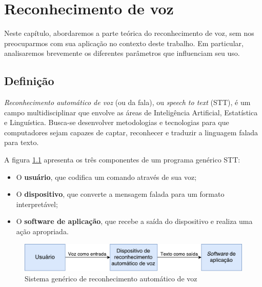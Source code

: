 \chapter{Reconhecimento de voz}
\label{cap:speech-recognition}

Neste capítulo, abordaremos a parte teórica do reconhecimento de voz, sem nos preocuparmos com sua aplicação no contexto deste trabalho. Em particular, analisaremos brevemente os diferentes parâmetros que influenciam seu uso.


\section{Definição}


\textit{Reconhecimento automático de voz} (ou da fala), ou \textit{speech to text} (STT), é um campo multidisciplinar que envolve as áreas de Inteligência Artificial, Estatística e Linguística. Busca-se desenvolver metodologias e tecnologias para que computadores sejam capazes de captar, reconhecer e traduzir a linguagem falada para texto.

A figura \ref{generic-stt} apresenta os três componentes de um programa genérico STT:

\begin{itemize}
\item O \textbf{usuário}, que codifica um comando através de sua voz;

\item O \textbf{dispositivo}, que converte a mensagem falada para um formato interpretável;

\item O \textbf{software de aplicação}, que recebe a saída do dispositivo e realiza uma ação apropriada.
\end{itemize}

\begin{figure}[H]
  \centering
  \includegraphics[width=.9\textwidth]{image/generic-stt.pdf}
  \caption{Sistema genérico de reconhecimento automático de voz}
  \label{generic-stt}
\end{figure}

